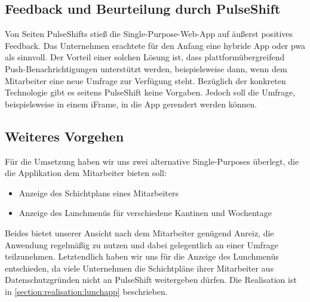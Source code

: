 \subsection{Feedback und Beurteilung durch PulseShift}

Von Seiten PulseShifts stieß die Single-Purpose-Web-App auf äußerst positives Feedback. Das Unternehmen erachtete für den Anfang eine hybride App oder \gls{pwa} als sinnvoll. Der Vorteil einer solchen Lösung ist, dass plattformübergreifend Push-Benachrichtigungen unterstützt werden, beispielsweise dann, wenn dem Mitarbeiter eine neue Umfrage zur Verfügung steht. Bezüglich der konkreten Technologie gibt es seitens PulseShift keine Vorgaben. Jedoch soll die Umfrage, beispielsweise in einem iFrame, in die App gerendert werden können.


\subsection{Weiteres Vorgehen}

Für die Umsetzung haben wir uns zwei alternative Single-Purposes überlegt, die die Applikation dem Mitarbeiter bieten soll:

\begin{itemize}
\item Anzeige des Schichtplans eines Mitarbeiters
\item Anzeige des Lunchmenüs für verschiedene Kantinen und Wochentage
\end{itemize}

Beides bietet unserer Ansicht nach dem Mitarbeiter genügend Anreiz, die Anwendung regelmäßig zu nutzen und dabei gelegentlich an einer Umfrage teilzunehmen. Letztendlich haben wir uns für die Anzeige des Lunchmenüs entschieden, da viele Unternehmen die Schichtpläne ihrer Mitarbeiter aus Datenschutzgründen nicht an PulseShift weitergeben dürfen. Die Realisation ist in \vref{section:realisation:lunchapp} beschrieben.